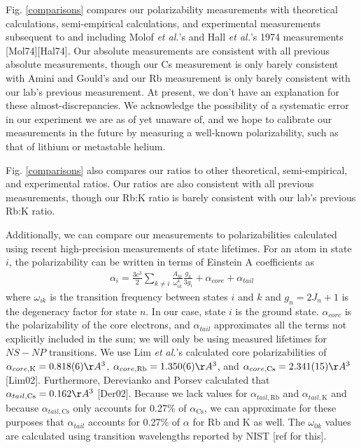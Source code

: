\documentclass[twocolumn, prl,showpacs,superscriptaddress]{revtex4-1}   %
\newcommand{\figref}[1]{Fig. \ref{#1}}
\newcommand{\acs}{\alpha_{\textrm{Cs}}}
\newcommand{\etal}{\textit{et al.}}
\begin{document}
\figref{comparisons} compares our polarizability measurements with theoretical calculations, semi-empirical calculations, and experimental measurements subsequent to and including Molof \etal's and Hall \etal's 1974 measurements [Mol74][Hal74]. Our absolute measurements are consistent with all previous absolute measurements, though our Cs measurement is only barely consistent with Amini and Gould's and our Rb measurement is only barely consistent with our lab's previous measurement. At present, we don't have an explanation for these almost-discrepancies. We acknowledge the possibility of a systematic error in our experiment we are as of yet unaware of, and we hope to calibrate our measurements in the future by measuring a well-known polarizability, such as that of lithium or metastable helium.

\figref{comparisons} also compares our ratios to other theoretical, semi-empirical, and experimental ratios. Our ratios are also consistent with all previous measurements, though our Rb:K ratio is barely consistent with our lab's previous Rb:K ratio. 

Additionally, we can compare our measurements to polarizabilities calculated using recent high-precision measurements of state lifetimes. For an atom in state $i$, the polarizability can be written in terms of Einstein A coefficients as
\begin{align}
	\alpha_i = \frac{3c^3}{2} \sum_{k\neq i} 
	\frac{A_{ki}}{\omega_{ik}^4} \frac{g_k}{3g_i}
	+ \alpha_{core}
	+ \alpha_{tail}
	\label{polFromLifetimes}
\end{align}
where $\omega_{ik}$ is the transition frequency between states $i$ and $k$ and $g_n = 2J_n+1$ is the degeneracy factor for state $n$. In our case, state $i$ is the ground state. $\alpha_{core}$ is the polarizability of the core electrons, and $\alpha_{tail}$ approximates all the terms not explicitly included in the sum; we will only be using measured lifetimes for $NS-NP$ transitions.
We use Lim \etal's calculated core polarizabilities of 
$\alpha_{core,\mathrm{K}} = 0.818(6) \AA^3$, 
$\alpha_{core,\mathrm{Rb}} = 1.350(6) \AA^3$, and 
$\alpha_{core,\mathrm{Cs}} = 2.341(15) \AA^3$ [Lim02]. 
Furthermore, Derevianko and Porsev calculated that 
$\alpha_{tail,\mathrm{Cs}} = 0.162 \AA^3$ [Der02]. Because we lack values for $\alpha_{tail,\mathrm{Rb}}$ and $\alpha_{tail,\mathrm{K}}$ and because $\alpha_{tail,\mathrm{Cs}}$ only accounts for 0.27\% of $\acs$, we can approximate for these purposes that $\alpha_{tail}$ accounts for 0.27\% of $\alpha$ for Rb and K as well. The $\omega_{0k}$ values are calculated using transition wavelengths reported by NIST [ref for this]. 
\end{document}

